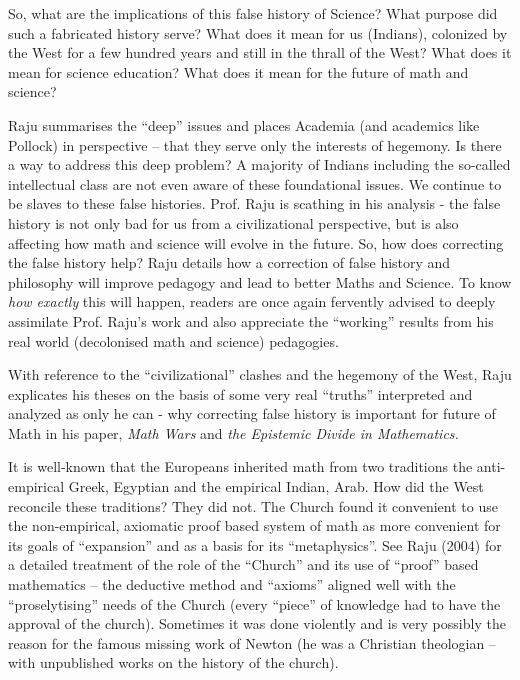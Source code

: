 So, what are the implications of this false history of Science? What purpose did such a fabricated history serve? What does it mean for us (Indians), colonized by the West for a few hundred years and still in the thrall of the West? What does it mean for science education? What does it mean for the future of math and science?

Raju summarises the “deep” issues and places Academia (and academics like Pollock) in perspective – that they serve only the interests of hegemony. Is there a way to address this deep problem? A majority of Indians including the so-called intellectual class are not even aware of these foundational issues. We continue to be slaves to these false histories. Prof. Raju is scathing in his analysis - the false history is not only bad for us from a civilizational perspective, but is also affecting how math and science will evolve in the future. So, how does correcting the false history help? Raju details how a correction of false history and philosophy will improve pedagogy and lead to better Maths and Science. To know \textit{how exactly} this will happen, readers are once again fervently advised to deeply assimilate Prof. Raju’s work and also appreciate the “working” results from his real world (decolonised math and science) pedagogies.

With reference to the “civilizational” clashes and the hegemony of the West, Raju explicates his theses on the basis of some very real “truths” interpreted and analyzed as only he can - why correcting false history is important for future of Math in his paper, \textit{Math Wars} and \textit{the Epistemic Divide in Mathematics.}

It is well-known that the Europeans inherited math from two traditions the anti-empirical Greek, Egyptian and the empirical Indian, Arab. How did the West reconcile these traditions? They did not. The Church found it convenient to use the non-empirical, axiomatic proof based system of math as more convenient for its goals of “expansion” and as a basis for its “metaphysics”. See Raju (2004) for a detailed treatment of the role of the “Church” and its use of “proof” based mathematics – the deductive method and “axioms” aligned well with the “proselytising” needs of the Church (every “piece” of knowledge had to have the approval of the church). Sometimes it was done violently and is very possibly the reason for the famous missing work of Newton (he was a Christian theologian – with unpublished works on the history of the church).

